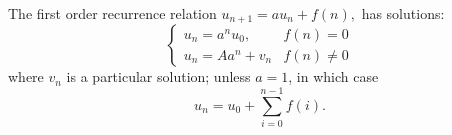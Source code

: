 The first order recurrence relation $u_{n+1}=au_{n}+f(n),$ 
has solutions:
\[ \left \{ 
\begin{array}{cc} 
  u_n = a^n u_0,  & f(n)=0 \\
  u_n = A a^n +  v_n & f(n) \neq 0 
\end{array} 
\right . \]
where $v_{n}$  is a particular solution;
unless $a=1$, in which case
\[ u_n = u_0 + \sum _{i=0} ^{n-1} f(i) . \]